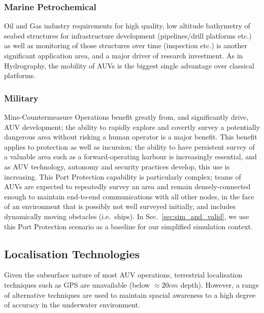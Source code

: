 \subsubsection{Marine Petrochemical}
Oil and Gas industry requirements for high quality, low altitude bathymetry of seabed structures for infrastructure development (pipelines/drill platforms etc.) as well as monitoring of those structures over time (inspection etc.) is another significant application area, and a major driver of research investment.
As in Hydrography, the mobility of AUVs is the biggest single advantage over classical platforms\cite{Morr2003}.

\subsubsection{Military}
Mine-Countermeasure Operations benefit greatly from, and significantly drive, AUV development; the ability to rapidly explore and covertly survey a potentially dangerous area without risking a human operator is a major benefit.
This benefit applies to protection as well as incursion; the ability to have persistent survey of a valuable area such as a forward-operating harbour is increasingly essential, and as AUV technology, autonomy and security practices develop, this use is increasing.
This Port Protection capability is particularly complex;  teams of AUVs are expected to repeatedly survey an area and remain densely-connected enough to maintain end-to-end communications with all other nodes, in the face of an environment that is possibly not well surveyed initially, and includes dynamically moving obstacles (i.e.\ ships).
In Sec.~\ref{sec:sim_and_valid}, we use this Port Protection scenario as a baseline for our simplified simulation context.


\subsection{Localisation Technologies}

Given the subsurface nature of most AUV operations, terrestrial localisation techniques such as GPS are unavailable (below $\approx 20cm$ depth). 
However, a range of alternative techniques are used to maintain spacial awareness to a high degree of accuracy in the underwater environment.
